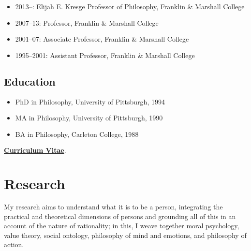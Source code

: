 \documentclass[%
  11pt,%
]{article}
\begin{document}
\begin{itemize}
  \item 2013--: Elijah E. Kresge Professor of Philosophy, Franklin \& Marshall College
  \item 2007--13: Professor, Franklin \& Marshall College
  \item 2001--07: Associate Professor, Franklin \& Marshall College
  \item 1995--2001: Assistant Professor, Franklin \& Marshall College
\end{itemize}

\subsection*{Education}

\begin{itemize}
  \item PhD in Philosophy, University of Pittsburgh, 1994
  \item MA in Philosophy, University of Pittsburgh, 1990
  \item BA in Philosophy, Carleton College, 1988
\end{itemize}

\noindent\href{https://drive.google.com/file/d/1-8fjo2F9EzgfDyYo_WSTYhaU-xrDNU8P/view}{\textbf{Curriculum Vitae}}.

\ifdefined\HCode
\fi

\section{Research}

My research aims to understand what it is to be a person, integrating the practical and theoretical dimensions of persons and grounding all of this in an account of the nature of rationality; in this, I weave together moral psychology, value theory, social ontology, philosophy of mind and emotions, and philosophy of action.
\end{document}
